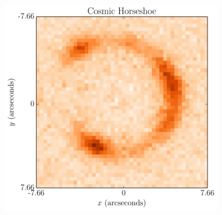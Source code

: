 \documentclass[useAMS,usenatbib]{mn2e}
\begin{document}

\begin{figure}
\begin{center}
\includegraphics[scale=0.5]{horseshoe_image.pdf}
\caption{\label{fig:horseshoe_image}}
\end{center}
\end{figure}
\end{document}
